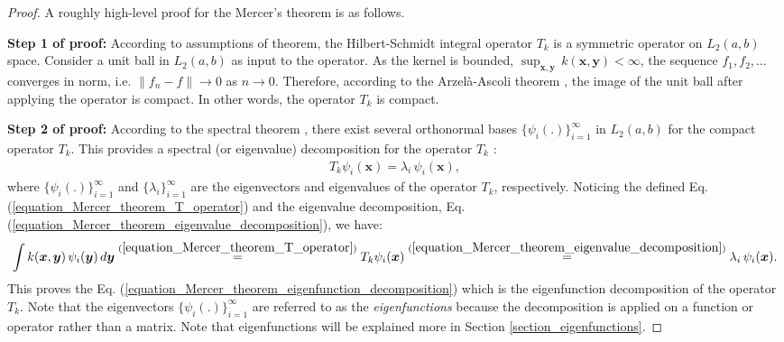 \documentclass[lang=cn,10pt]{gorgeousnbook}
\numberwithin{equation}{section}%
\numberwithin{figure}{section}%
\begin{document}
\begin{proof}
A roughly high-level proof for the Mercer's theorem is as follows. 


\textbf{Step 1 of proof:}
According to assumptions of theorem, the Hilbert-Schmidt integral operator $T_k$ is a symmetric operator on $L_2(a,b)$ space. 
Consider a unit ball in $L_2(a,b)$ as input to the operator.
As the kernel is bounded, $\sup_{\boldsymbol{x}, \boldsymbol{y}}\, k(\boldsymbol{x}, \boldsymbol{y}) < \infty$, the sequence $f_1, f_2, \dots$ converges in norm, i.e. $\|f_n - f\| \rightarrow 0$ as $n \rightarrow 0$. 
Therefore, according to the Arzel{\`a}-Ascoli theorem \cite{arzela1895sulle}, the image of the unit ball after applying the operator is compact. In other words, the operator $T_k$ is compact. 

\textbf{Step 2 of proof:}
According to the spectral theorem \cite{hawkins1975cauchy}, there exist several orthonormal bases $\{\psi_i(.)\}_{i=1}^\infty$ in $L_2(a,b)$ for the compact operator $T_k$. This provides a spectral (or eigenvalue) decomposition for the operator $T_k$ \cite{ghojogh2019eigenvalue}:
\begin{align}\label{equation_Mercer_theorem_eigenvalue_decomposition}
T_k \psi_i(\boldsymbol{x}) = \lambda_i\, \psi_i(\boldsymbol{x}),
\end{align}
where $\{\psi_i(.)\}_{i=1}^\infty$ and $\{\lambda_i\}_{i=1}^\infty$ are the eigenvectors and eigenvalues of the operator $T_k$, respectively. 
Noticing the defined Eq. (\ref{equation_Mercer_theorem_T_operator}) and the eigenvalue decomposition, Eq. (\ref{equation_Mercer_theorem_eigenvalue_decomposition}), we have: 
\begin{align}
\int k(\boldsymbol{x}, \boldsymbol{y})\, \psi_i(\boldsymbol{y})\, d\boldsymbol{y} \overset{(\ref{equation_Mercer_theorem_T_operator})}{=} T_k \psi_i(\boldsymbol{x})  \overset{(\ref{equation_Mercer_theorem_eigenvalue_decomposition})}{=} \lambda_i\, \psi_i(\boldsymbol{x}).
\end{align}
This proves the Eq. (\ref{equation_Mercer_theorem_eigenfunction_decomposition}) which is the eigenfunction decomposition of the operator $T_k$. Note that the eigenvectors $\{\psi_i(.)\}_{i=1}^\infty$ are referred to as the \textit{eigenfunctions} because the decomposition is applied on a function or operator rather than a matrix. 
Note that eigenfunctions will be explained more in Section \ref{section_eigenfunctions}.


\end{proof}
\end{document}
